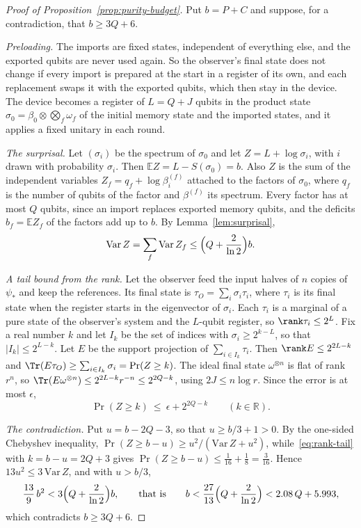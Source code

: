 \begin{proof}[Proof of Proposition~\ref{prop:purity-budget}]
Put $b=P+C$ and suppose, for a contradiction, that $b\ge3Q+6$.

\emph{Preloading.} The imports are fixed states, independent of everything else, and the exported qubits are never used again. So the observer's
final state does not change if every import is prepared at the start in a register of its own, and each replacement swaps it with the exported
qubits, which then stay in the device. The device becomes a register of $L=Q+J$ qubits in the product state
$\sigma_0=\beta_0\otimes\bigotimes_f\omega_f$ of the initial memory state and the imported states, and it applies a fixed unitary in each round.

\emph{The surprisal.} Let $(\sigma_i)$ be the spectrum of $\sigma_0$ and let $Z=L+\log\sigma_i$, with $i$ drawn with probability $\sigma_i$. Then
$\mathbb EZ=L-S(\sigma_0)=b$. Also $Z$ is the sum of the independent variables $Z_f=q_f+\log\beta^{(f)}_i$ attached to the factors of $\sigma_0$,
where $q_f$ is the number of qubits of the factor and $\beta^{(f)}$ its spectrum. Every factor has at most $Q$ qubits, since an import replaces
exported memory qubits, and the deficits $b_f=\mathbb EZ_f$ of the factors add up to $b$. By Lemma~\ref{lem:surprisal},
\[
\mathrm{Var}\,Z=\sum_f\mathrm{Var}\,Z_f\le\Bigl(Q+\frac2{\ln2}\Bigr)b .
\]

\emph{A tail bound from the rank.} Let the observer feed the input halves of $n$ copies of $\psi_*$ and keep the references. Its final state is
$\tau_O=\sum_i\sigma_i\tau_i$, where $\tau_i$ is its final state when the register starts in the eigenvector of $\sigma_i$. Each $\tau_i$ is a
marginal of a pure state of the observer's system and the $L$-qubit register, so $\rank\tau_i\le2^L$. Fix a real number $k$ and let $I_k$ be the
set of indices with $\sigma_i\ge2^{k-L}$, so that $|I_k|\le2^{L-k}$. Let $E$ be the support projection of $\sum_{i\in I_k}\tau_i$. Then
$\rank E\le2^{2L-k}$ and $\Tr(E\tau_O)\ge\sum_{i\in I_k}\sigma_i=\Pr(Z\ge k)$. The ideal final state $\omega^{\otimes n}$ is flat of rank $r^n$, so
$\Tr(E\omega^{\otimes n})\le2^{2L-k}r^{-n}\le2^{2Q-k}$, using $2J\le n\log r$. Since the error is at most $\epsilon$,
\begin{equation}\label{eq:rank-tail}
\Pr(Z\ge k)\ \le\ \epsilon+2^{2Q-k}\qquad(k\in\mathbb R).
\end{equation}

\emph{The contradiction.} Put $u=b-2Q-3$, so that $u\ge b/3+1>0$. By the one-sided Chebyshev inequality,
$\Pr(Z\ge b-u)\ge u^2/(\mathrm{Var}\,Z+u^2)$, while~\eqref{eq:rank-tail} with $k=b-u=2Q+3$ gives $\Pr(Z\ge b-u)\le\frac1{16}+\frac18=\frac3{16}$. Hence
$13u^2\le3\,\mathrm{Var}\,Z$, and with $u>b/3$,
\[
\frac{13}9\,b^2<3\Bigl(Q+\frac2{\ln2}\Bigr)b,\qquad\text{that is}\qquad b<\frac{27}{13}\Bigl(Q+\frac2{\ln2}\Bigr)<2.08\,Q+5.993 ,
\]
which contradicts $b\ge3Q+6$.
\end{proof}

